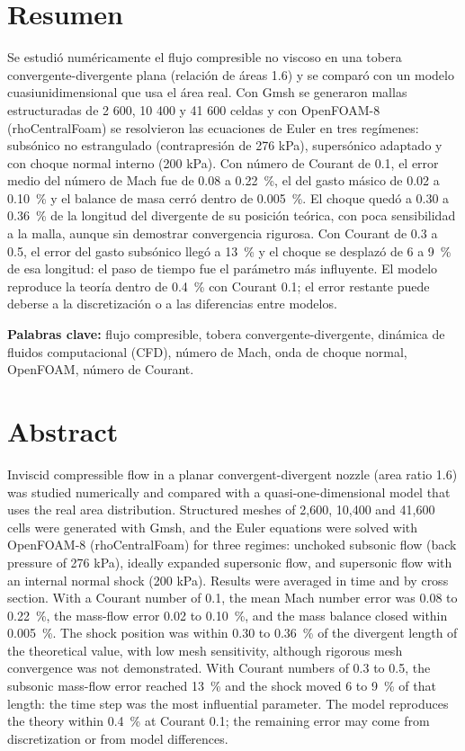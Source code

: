 \documentclass[12pt,letterpaper]{article}
\numberwithin{equation}{section}
\begin{document}
\section*{Resumen}
Se estudió numéricamente el flujo compresible no viscoso en una tobera convergente-divergente plana (relación de áreas 1.6) y se comparó con un modelo cuasiunidimensional que usa el área real. Con Gmsh se generaron mallas estructuradas de 2 600, 10 400 y 41 600 celdas y con OpenFOAM-8 (rhoCentralFoam) se resolvieron las ecuaciones de Euler en tres regímenes: subsónico no estrangulado (contrapresión de 276 kPa), supersónico adaptado y con choque normal interno (200 kPa). Con número de Courant de 0.1, el error medio del número de Mach fue de 0.08 a 0.22~\%, el del gasto másico de 0.02 a 0.10~\% y el balance de masa cerró dentro de 0.005~\%. El choque quedó a 0.30 a 0.36~\% de la longitud del divergente de su posición teórica, con poca sensibilidad a la malla, aunque sin demostrar convergencia rigurosa. Con Courant de 0.3 a 0.5, el error del gasto subsónico llegó a 13~\% y el choque se desplazó de 6 a 9~\% de esa longitud: el paso de tiempo fue el parámetro más influyente. El modelo reproduce la teoría dentro de 0.4~\% con Courant 0.1; el error restante puede deberse a la discretización o a las diferencias entre modelos.

\vspace{0.3cm}
\noindent\textbf{Palabras clave:} flujo compresible, tobera convergente-divergente, dinámica de fluidos computacional (CFD), número de Mach, onda de choque normal, OpenFOAM, número de Courant.

\newpage
\section*{Abstract}
Inviscid compressible flow in a planar convergent-divergent nozzle (area ratio 1.6) was studied numerically and compared with a quasi-one-dimensional model that uses the real area distribution. Structured meshes of 2,600, 10,400 and 41,600 cells were generated with Gmsh, and the Euler equations were solved with OpenFOAM-8 (rhoCentralFoam) for three regimes: unchoked subsonic flow (back pressure of 276 kPa), ideally expanded supersonic flow, and supersonic flow with an internal normal shock (200 kPa). Results were averaged in time and by cross section. With a Courant number of 0.1, the mean Mach number error was 0.08 to 0.22~\%, the mass-flow error 0.02 to 0.10~\%, and the mass balance closed within 0.005~\%. The shock position was within 0.30 to 0.36~\% of the divergent length of the theoretical value, with low mesh sensitivity, although rigorous mesh convergence was not demonstrated. With Courant numbers of 0.3 to 0.5, the subsonic mass-flow error reached 13~\% and the shock moved 6 to 9~\% of that length: the time step was the most influential parameter. The model reproduces the theory within 0.4~\% at Courant 0.1; the remaining error may come from discretization or from model differences.
\end{document}
